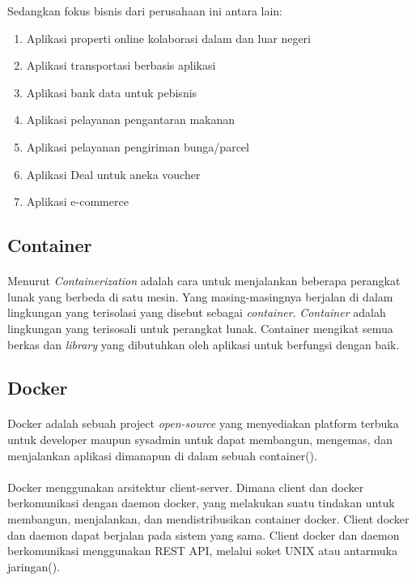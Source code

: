 \documentclass[./bab_2.tex]{subfiles}
\begin{document}
    Sedangkan fokus bisnis dari perusahaan ini antara lain:
    \begin{enumerate}
      \item Aplikasi properti online kolaborasi dalam dan luar negeri
      \item Aplikasi transportasi berbasis aplikasi
      \item Aplikasi bank data untuk pebisnis
      \item Aplikasi pelayanan pengantaran makanan
      \item Aplikasi pelayanan pengiriman bunga/parcel
      \item Aplikasi Deal untuk aneka voucher
      \item Aplikasi e-commerce
    \end{enumerate}

  \subsection{Container}
    \paragraph*{}Menurut \textcite{shah19}
    \textit{Containerization} adalah cara untuk menjalankan
    beberapa perangkat lunak yang berbeda di satu mesin.
    Yang masing-masingnya berjalan di dalam lingkungan yang
    terisolasi yang disebut sebagai \textit{container}.
    \textit{Container} adalah lingkungan yang terisosali
    untuk perangkat lunak. Container mengikat semua berkas
    dan \textit{library} yang dibutuhkan oleh aplikasi untuk
    berfungsi dengan baik.

  \subsection{Docker}
    \paragraph*{}Docker adalah sebuah project
    \textit{open-source} yang menyediakan platform terbuka
    untuk developer maupun sysadmin untuk dapat membangun,
    mengemas, dan menjalankan aplikasi dimanapun di dalam
    sebuah container(\cite{docker_overview}).

    \paragraph*{}Docker menggunakan arsitektur client-server. Dimana client
    dan docker berkomunikasi dengan daemon docker, yang
    melakukan suatu tindakan untuk membangun,
    menjalankan, dan mendistribusikan container
    docker. Client docker dan daemon dapat berjalan pada
    sistem yang sama. Client docker dan daemon
    berkomunikasi menggunakan REST API, melalui soket
    UNIX atau antarmuka jaringan(\cite{docker_overview}).
\end{document}
